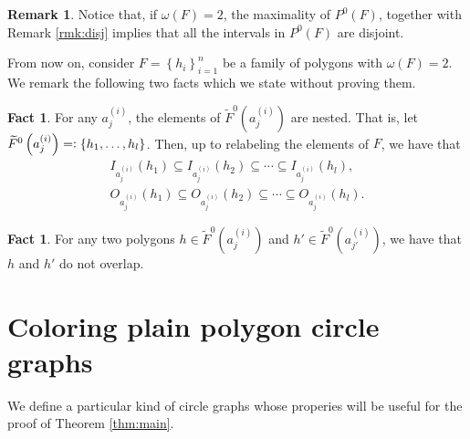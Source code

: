 \documentclass[12pt]{article}
\theoremstyle{definition}
\newtheorem{rmk}[thm]{Remark}
\newtheorem{fact}[thm]{Fact}
\newcommand{\eqdef}{=\vcentcolon}
\begin{document}
     \begin{rmk}
         Notice that, if 
         $\omega\left(F\right) = 2$,
         the maximality of
         $P^{0}\left(F\right)$,
         together with 
         Remark \ref{rmk:disj}
         implies that all the
         intervals in $P^{0}\left(F\right)$
         are disjoint.
     \end{rmk}

     From now on, consider
     $F = \left\{h_{i}\right\}_{i = 1}^{n}$ 
     be a family of polygons
     with $\omega\left(F\right)=2$.
     We remark the following
     two facts which we 
     state without proving them.

     \begin{fact} \label{fact:single}
         For any $a_{j}^{\left(i\right)}$,
         the elements of
         $\widetilde{F}^{0}\left(a_{j}^{\left(i\right)}\right)$ 
         are nested. That is, let
             $\widetilde{F}^{0}\left(a_{j}^{\left(i\right)}\right) 
             \eqdef \left\{h_1, \ldots, h_{l}\right\}$.
         Then, up to relabeling
         the elements of $F$, we have that
         \begin{gather*}
             I_{a_{j}^{\left(i\right)}}\left(h_1\right)
             \subseteq I_{a_{j}^{\left(i\right)}}\left(h_2\right)
             \subseteq \cdots
             \subseteq I_{a_{j}^{\left(i\right)}}\left(h_{l}\right), \\
             O_{a_{j}^{\left(i\right)}}\left(h_1\right)
             \subseteq O_{a_{j}^{\left(i\right)}}\left(h_2\right)
             \subseteq \cdots
             \subseteq O_{a_{j}^{\left(i\right)}}\left(h_{l}\right).
         \end{gather*}
     \end{fact}
     
     \begin{fact} \label{fact:double}
         For any two polygons
         $h \in \widetilde{F}^{0}\left(a_{j}^{\left(i\right)}\right)$ 
         and 
         $h' \in \widetilde{F}^{0}\left(a_{j'}^{\left(i\right)}\right)$, 
         we have that $h$ and $h'$
         do not overlap.    
     \end{fact}

     \section{Coloring plain polygon circle graphs}

     We define a particular
     kind of circle graphs
     whose properies
     will be useful for the
     proof of Theorem \ref{thm:main}.
\end{document}
